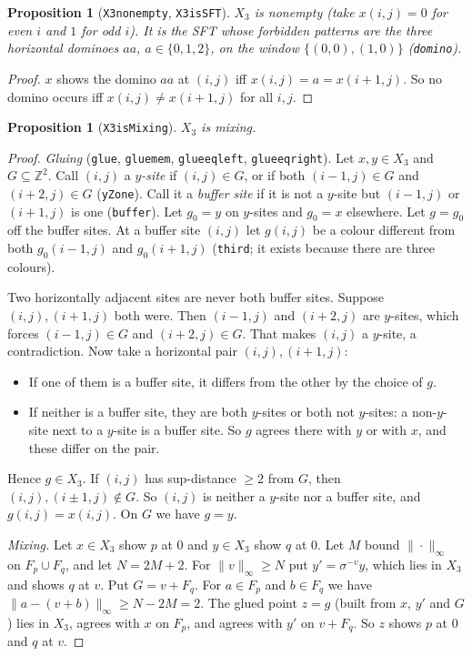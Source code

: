 \documentclass[11pt]{article}
\newtheorem{proposition}[theorem]{Proposition}
\theoremstyle{definition}
\theoremstyle{remark}
\renewcommand{\_}{\oldus\allowbreak}
\newcommand{\Z}{\mathbb{Z}}
\newcommand{\lean}[1]{\texttt{#1}}
\begin{document}
\begin{proposition}[\lean{X3\_nonempty}, \lean{X3\_isSFT}]
$X_3$ is nonempty (take $x(i,j)=0$ for even $i$ and $1$ for odd $i$). It is the SFT whose forbidden
patterns are the three horizontal dominoes $aa$, $a\in\{0,1,2\}$, on the window $\{(0,0),(1,0)\}$
(\lean{domino}).
\end{proposition}

\begin{proof}
$x$ shows the domino $aa$ at $(i,j)$ iff $x(i,j)=a=x(i+1,j)$. So no domino occurs iff
$x(i,j)\neq x(i+1,j)$ for all $i,j$.
\end{proof}

\begin{proposition}[\lean{X3\_isMixing}]\label{prop:mixing}
$X_3$ is mixing.
\end{proposition}

\begin{proof}
\emph{Gluing} (\lean{glue}, \lean{glue\_mem}, \lean{glue\_eq\_left}, \lean{glue\_eq\_right}). Let
$x,y\in X_3$ and $G\subseteq\Z^2$. Call $(i,j)$ a \emph{$y$-site} if $(i,j)\in G$, or if both
$(i-1,j)\in G$ and $(i+2,j)\in G$ (\lean{yZone}). Call it a \emph{buffer site} if it is not a $y$-site
but $(i-1,j)$ or $(i+1,j)$ is one (\lean{buffer}). Let $g_0=y$ on $y$-sites and $g_0=x$ elsewhere.
Let $g=g_0$ off the buffer sites. At a buffer site $(i,j)$ let $g(i,j)$ be a colour different from both
$g_0(i-1,j)$ and $g_0(i+1,j)$ (\lean{third}; it exists because there are three colours).

Two horizontally adjacent sites are never both buffer sites. Suppose $(i,j),(i+1,j)$ both were. Then
$(i-1,j)$ and $(i+2,j)$ are $y$-sites, which forces $(i-1,j)\in G$ and $(i+2,j)\in G$. That makes
$(i,j)$ a $y$-site, a contradiction. Now take a horizontal pair $(i,j),(i+1,j)$:
\begin{itemize}[nosep]
\item If one of them is a buffer site, it differs from the other by the choice of $g$.
\item If neither is a buffer site, they are both $y$-sites or both not $y$-sites: a non-$y$-site next
to a $y$-site is a buffer site. So $g$ agrees there with $y$ or with $x$, and these differ on the pair.
\end{itemize}
Hence $g\in X_3$. If $(i,j)$ has sup-distance $\ge2$ from $G$, then $(i,j),(i\pm1,j)\notin G$. So
$(i,j)$ is neither a $y$-site nor a buffer site, and $g(i,j)=x(i,j)$. On $G$ we have $g=y$.

\emph{Mixing.} Let $x\in X_3$ show $p$ at $0$ and $y\in X_3$ show $q$ at $0$. Let $M$ bound
$\|\cdot\|_\infty$ on $F_p\cup F_q$, and let $N=2M+2$. For $\|v\|_\infty\ge N$ put $y'=\sigma^{-v}y$, which
lies in $X_3$ and shows $q$ at $v$. Put $G=v+F_q$. For $a\in F_p$ and $b\in F_q$ we have
$\|a-(v+b)\|_\infty\ge N-2M=2$. The glued point $z=g$ (built from $x$, $y'$ and $G$) lies in $X_3$,
agrees with $x$ on $F_p$, and agrees with $y'$ on $v+F_q$. So $z$ shows $p$ at $0$ and $q$ at $v$.
\end{proof}
\end{document}
